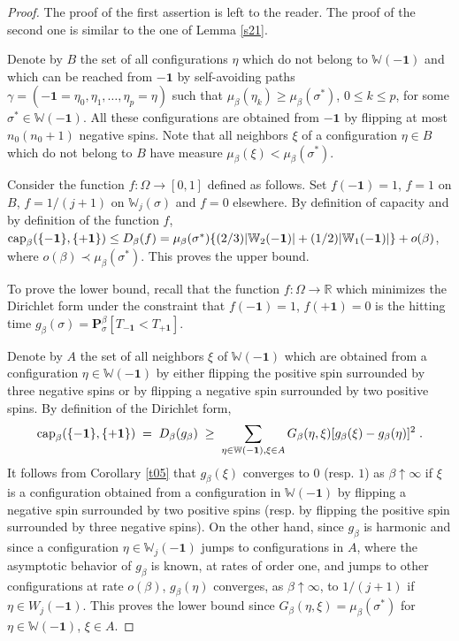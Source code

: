 \documentclass[reqno]{amsart}
\begin{document}
\begin{proof}
The proof of the first assertion is left to the reader. The proof of
the second one is similar to the one of Lemma \ref{s21}.

Denote by $B$ the set of all configurations $\eta$ which do not
belong to ${{\mathbb W}}(-{{\mathbf 1}})$ and which can be reached from $-{{\mathbf 1}}$ by
self-avoiding paths $\gamma = (-{{\mathbf 1}} = \eta_0, \eta_1, \dots, \eta_p
= \eta)$ such that $\mu_\beta (\eta_k) \ge \mu_\beta (\sigma^*)$,
$0\le k\le p$, for some $\sigma^* \in {{\mathbb W}}(-{{\mathbf 1}})$. All these
configurations are obtained from $-{{\mathbf 1}}$ by flipping at most
$n_0(n_0+1)$ negative spins. Note that all neighbors $\xi$ of a
configuration $\eta \in B$ which do not belong to $B$ have measure
$\mu_\beta (\xi) < \mu_\beta (\sigma^*)$.

Consider the function $f:\Omega \to [0,1]$ defined as follows.  Set
$f(-{{\mathbf 1}})=1$, $f=1$ on $B$, $f=1/(j+1)$ on ${{\mathbb W}}_j(\sigma)$ and
$f=0$ elsewhere. By definition of capacity and by definition of the
function $f$, ${{\rm cap}}_\beta (\{-{{\mathbf 1}}\} , \{+{{\mathbf 1}}\}) \le D_\beta(f) =
\mu_\beta (\sigma^*) \{(2/3) |{{\mathbb W}}_2(-{{\mathbf 1}})| + (1/2) |{{\mathbb W}}_1(-{{\mathbf 1}})|\} + o(\beta)$, where $o(\beta) \prec \mu_\beta (\sigma^*)$.  This
proves the upper bound.

To prove the lower bound, recall that the function $f:\Omega \to {{\mathbb R}}$ which minimizes the Dirichlet form under the constraint that
$f(-{{\mathbf 1}})=1$, $f(+{{\mathbf 1}})=0$ is the hitting time $g_\beta(\sigma) =
{{\mathbf P}}^\beta_\sigma [T_{-{{\mathbf 1}}} < T_{+{{\mathbf 1}}}]$.

Denote by $A$ the set of all neighbors $\xi$ of ${{\mathbb W}}(-{{\mathbf 1}})$ which
are obtained from a configuration $\eta \in {{\mathbb W}}(-{{\mathbf 1}})$ by either
flipping the positive spin surrounded by three negative spins or by
flipping a negative spin surrounded by two positive spins. By
definition of the Dirichlet form,
\begin{equation*}
{{\rm cap}}_\beta(\{- {{\mathbf 1}}\} , \{+{{\mathbf 1}}\}) \;=\; D_\beta(g_\beta) \;\ge\; 
\sum_{\eta \in {{\mathbb W}}(-{{\mathbf 1}}), \xi \in A} G_\beta(\eta,\xi)
[g_\beta (\xi)- g_\beta (\eta)]^2 \;. 
\end{equation*}
It follows from Corollary \ref{t05} that $g_\beta (\xi)$ converges to
$0$ (resp. $1$) as $\beta\uparrow\infty$ if $\xi$ is a configuration
obtained from a configuration in ${{\mathbb W}}(-{{\mathbf 1}})$ by flipping a
negative spin surrounded by two positive spins (resp. by flipping the
positive spin surrounded by three negative spins). On the other hand,
since $g_\beta$ is harmonic and since a configuration $\eta\in {{\mathbb W}}_j(-{{\mathbf 1}})$ jumps to configurations in $A$, where the asymptotic
behavior of $g_\beta$ is known, at rates of order one, and jumps to
other configurations at rate $o(\beta)$, $g_\beta (\eta)$ converges,
as $\beta\uparrow\infty$, to $1/(j+1)$ if $\eta\in W_j(-{{\mathbf 1}})$. This
proves the lower bound since $G_\beta(\eta,\xi) = \mu_\beta
(\sigma^*)$ for $\eta \in {{\mathbb W}}(-{{\mathbf 1}})$, $\xi \in A$.
\end{proof}
\end{document}
